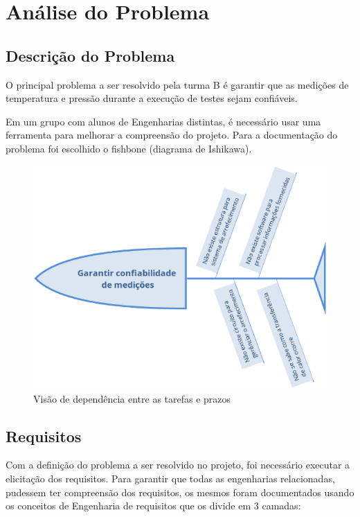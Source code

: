 \chapter{Análise do Problema}
\section{Descrição do Problema}
O principal problema a ser resolvido pela turma B é garantir que as medições de temperatura e pressão durante a execução de testes sejam confiáveis.

Em um grupo com alunos de Engenharias distintas, é necessário usar uma ferramenta para melhorar a compreensão do projeto. Para a documentação do problema foi escolhido o fishbone (diagrama de Ishikawa).

\begin{figure}[!htb]                                                               
   \centering                                                                      
   \includegraphics[width=15cm, keepaspectratio=true]{figuras/fishbone.eps}
   \caption{Visão de dependência entre as tarefas e prazos}                        
\end{figure}

\section{Requisitos}
Com a definição do problema a ser resolvido no projeto, foi necessário executar a elicitação dos requisitos. Para garantir que todas as engenharias relacionadas, pudessem ter compreensão dos requisitos, os mesmos foram documentados usando os conceitos de Engenharia de requisitos que os divide em 3 camadas:


